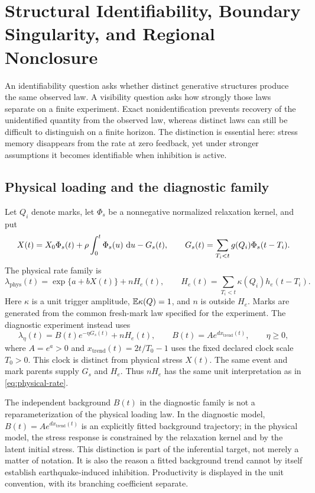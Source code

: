 \chapter{Structural Identifiability, Boundary Singularity, and Regional Nonclosure}\label{chap:identifiability}\label{ch:identifiability}

An identifiability question asks whether distinct generative structures produce the same observed law. A visibility question asks how strongly those laws separate on a finite experiment. Exact nonidentification prevents recovery of the unidentified quantity from the observed law, whereas distinct laws can still be difficult to distinguish on a finite horizon. The distinction is essential here: stress memory disappears from the rate at zero feedback, yet under stronger assumptions it becomes identifiable when inhibition is active.

\section{Physical loading and the diagnostic family}

Let \(Q_i\) denote marks, let \(\Phi_s\) be a nonnegative normalized relaxation kernel, and put
\[
X(t)=X_0\Phi_s(t)+\rho\int_0^t\Phi_s(u)\,\mathop{}\!\mathrm{d} u-G_s(t),
\qquad
G_s(t)=\sum_{T_i<t}g(Q_i)\Phi_s(t-T_i).
\]
The physical rate family is
\begin{equation}
\lambda_{\mathrm{phys}}(t)
=\exp\{a+bX(t)\}+nH_e(t),
\qquad
H_e(t)=\sum_{T_i<t}\kappa(Q_i)h_e(t-T_i).
\label{eq:physical-rate}
\end{equation}
Here \(\kappa\) is a unit trigger amplitude, \(\mathbb{E} \kappa(Q)=1\), and \(n\) is outside \(H_e\). Marks are generated from the common fresh-mark law specified for the experiment. The diagnostic experiment instead uses
\begin{equation}
\lambda_\eta(t)=B(t)e^{-\eta G_s(t)}+nH_e(t),
\qquad
B(t)=A e^{d x_{\mathrm{trend}}(t)},\qquad \eta\ge0,
\label{eq:diagnostic-rate}
\end{equation}
where \(A=e^a>0\) and \(x_{\mathrm{trend}}(t)=2t/T_0-1\) uses the fixed declared clock scale \(T_0>0\). This clock is distinct from physical stress \(X(t)\). The same event and mark parents supply \(G_s\) and \(H_e\). Thus \(nH_e\) has the same unit interpretation as in \eqref{eq:physical-rate}.

The independent background \(B(t)\) in the diagnostic family is not a reparameterization of the physical loading law. In the diagnostic model, \(B(t)=A e^{d x_{\mathrm{trend}}(t)}\) is an explicitly fitted background trajectory; in the physical model, the stress response is constrained by the relaxation kernel and by the latent initial stress. This distinction is part of the inferential target, not merely a matter of notation. It is also the reason a fitted background trend cannot by itself establish earthquake-induced inhibition. Productivity is displayed in the unit convention, with its branching coefficient separate.

